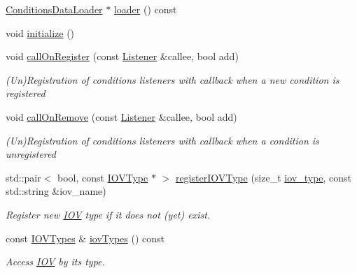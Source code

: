 \begin{DoxyCompactItemize}
\hyperlink{class_d_d4hep_1_1_conditions_1_1_conditions_data_loader}{Conditions\+Data\+Loader} $\ast$ \hyperlink{class_d_d4hep_1_1_conditions_1_1_conditions_manager_object_a0d4a2c082f554f4ece6f298185d8b6bc}{loader} () const
\item 
void \hyperlink{class_d_d4hep_1_1_conditions_1_1_conditions_manager_object_a598756c7672c67065f3d116689f95722}{initialize} ()
\item 
void \hyperlink{class_d_d4hep_1_1_conditions_1_1_conditions_manager_object_a74aa106c194fb9ca929c8cf523632ce3}{call\+On\+Register} (const \hyperlink{class_d_d4hep_1_1_conditions_1_1_conditions_manager_object_ac4cd1e3a448bc1f8bae384d194f10c23}{Listener} \&callee, bool add)
\begin{DoxyCompactList}\small\item\em (Un)Registration of conditions listeners with callback when a new condition is registered \end{DoxyCompactList}\item 
void \hyperlink{class_d_d4hep_1_1_conditions_1_1_conditions_manager_object_a4a8912db5a30d6792455aef57c223bed}{call\+On\+Remove} (const \hyperlink{class_d_d4hep_1_1_conditions_1_1_conditions_manager_object_ac4cd1e3a448bc1f8bae384d194f10c23}{Listener} \&callee, bool add)
\begin{DoxyCompactList}\small\item\em (Un)Registration of conditions listeners with callback when a condition is unregistered \end{DoxyCompactList}\item 
std\+::pair$<$ bool, const \hyperlink{class_d_d4hep_1_1_i_o_v_type}{I\+O\+V\+Type} $\ast$ $>$ \hyperlink{class_d_d4hep_1_1_conditions_1_1_conditions_manager_object_a4206a6f248b0712fb7e731f99e2c096a}{register\+I\+O\+V\+Type} (size\+\_\+t \hyperlink{class_d_d4hep_1_1_conditions_1_1_conditions_manager_object_a0190ec510ca46da4a1cc908ac3c3a1dd}{iov\+\_\+type}, const std\+::string \&iov\+\_\+name)
\begin{DoxyCompactList}\small\item\em Register new \hyperlink{class_d_d4hep_1_1_i_o_v}{I\+OV} type if it does not (yet) exist. \end{DoxyCompactList}\item 
const \hyperlink{class_d_d4hep_1_1_conditions_1_1_conditions_manager_object_a8c3b7d5bdfb7fc6bf6e61ddba5a5f652}{I\+O\+V\+Types} \& \hyperlink{class_d_d4hep_1_1_conditions_1_1_conditions_manager_object_a15d8bc1bbe6bd7f5aeb2c83be9035bff}{iov\+Types} () const
\begin{DoxyCompactList}\small\item\em Access \hyperlink{class_d_d4hep_1_1_i_o_v}{I\+OV} by its type. \end{DoxyCompactList}\item 

\end{DoxyCompactItemize}
